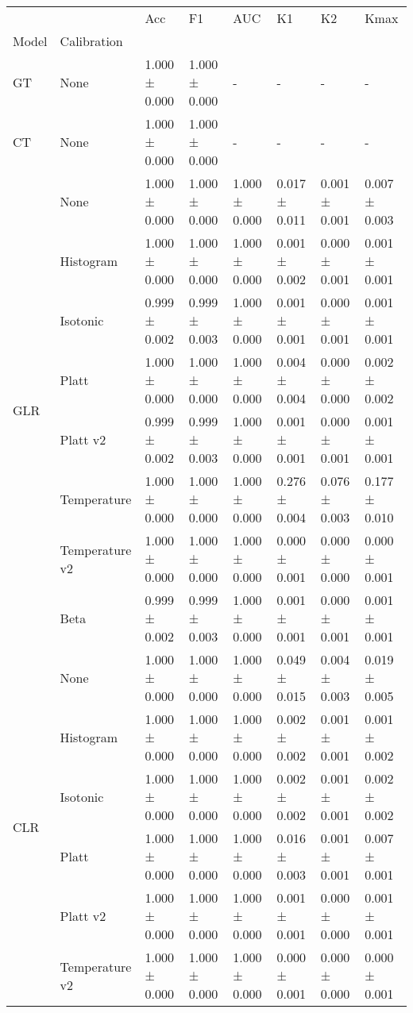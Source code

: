 \begin{tabular}{llllllll}
\toprule
 &  & Acc & F1 & AUC & K1 & K2 & Kmax \\
Model & Calibration &  &  &  &  &  &  \\
\midrule
GT & None & 1.000 ± 0.000 & 1.000 ± 0.000 & - & - & - & - \\
\cline{1-8}
CT & None & 1.000 ± 0.000 & 1.000 ± 0.000 & - & - & - & - \\
\cline{1-8}
\multirow[t]{8}{*}{GLR} & None & 1.000 ± 0.000 & 1.000 ± 0.000 & 1.000 ± 0.000 & 0.017 ± 0.011 & 0.001 ± 0.001 & 0.007 ± 0.003 \\
 & Histogram & 1.000 ± 0.000 & 1.000 ± 0.000 & 1.000 ± 0.000 & 0.001 ± 0.002 & 0.000 ± 0.001 & 0.001 ± 0.001 \\
 & Isotonic & 0.999 ± 0.002 & 0.999 ± 0.003 & 1.000 ± 0.000 & 0.001 ± 0.001 & 0.000 ± 0.001 & 0.001 ± 0.001 \\
 & Platt & 1.000 ± 0.000 & 1.000 ± 0.000 & 1.000 ± 0.000 & 0.004 ± 0.004 & 0.000 ± 0.000 & 0.002 ± 0.002 \\
 & Platt v2 & 0.999 ± 0.002 & 0.999 ± 0.003 & 1.000 ± 0.000 & 0.001 ± 0.001 & 0.000 ± 0.001 & 0.001 ± 0.001 \\
 & Temperature & 1.000 ± 0.000 & 1.000 ± 0.000 & 1.000 ± 0.000 & 0.276 ± 0.004 & 0.076 ± 0.003 & 0.177 ± 0.010 \\
 & Temperature v2 & 1.000 ± 0.000 & 1.000 ± 0.000 & 1.000 ± 0.000 & 0.000 ± 0.001 & 0.000 ± 0.000 & 0.000 ± 0.001 \\
 & Beta & 0.999 ± 0.002 & 0.999 ± 0.003 & 1.000 ± 0.000 & 0.001 ± 0.001 & 0.000 ± 0.001 & 0.001 ± 0.001 \\
\cline{1-8}
\multirow[t]{7}{*}{CLR} & None & 1.000 ± 0.000 & 1.000 ± 0.000 & 1.000 ± 0.000 & 0.049 ± 0.015 & 0.004 ± 0.003 & 0.019 ± 0.005 \\
 & Histogram & 1.000 ± 0.000 & 1.000 ± 0.000 & 1.000 ± 0.000 & 0.002 ± 0.002 & 0.001 ± 0.001 & 0.001 ± 0.002 \\
 & Isotonic & 1.000 ± 0.000 & 1.000 ± 0.000 & 1.000 ± 0.000 & 0.002 ± 0.002 & 0.001 ± 0.001 & 0.002 ± 0.002 \\
 & Platt & 1.000 ± 0.000 & 1.000 ± 0.000 & 1.000 ± 0.000 & 0.016 ± 0.003 & 0.001 ± 0.001 & 0.007 ± 0.001 \\
 & Platt v2 & 1.000 ± 0.000 & 1.000 ± 0.000 & 1.000 ± 0.000 & 0.001 ± 0.001 & 0.000 ± 0.000 & 0.001 ± 0.001 \\
 & Temperature v2 & 1.000 ± 0.000 & 1.000 ± 0.000 & 1.000 ± 0.000 & 0.000 ± 0.001 & 0.000 ± 0.000 & 0.000 ± 0.001 \\

\end{tabular}
